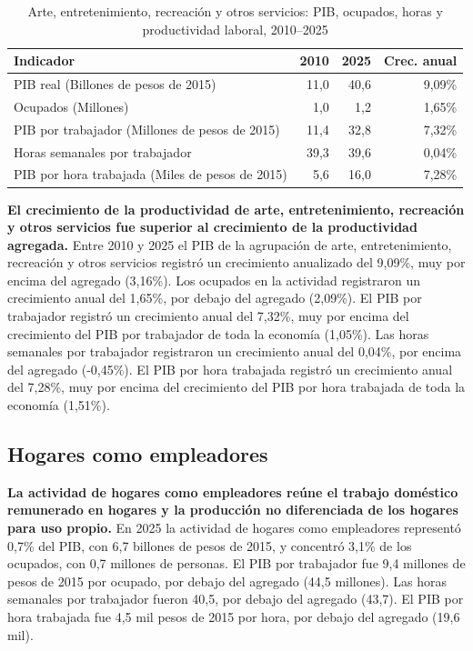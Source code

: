 \begin{table}[H]
\centering
\caption{Arte, entretenimiento, recreación y otros servicios: PIB, ocupados, horas y productividad laboral, 2010--2025}
\label{tab:sector_r_s_productividad}
\small
\begin{tabular}{lrrr}
\toprule
Indicador & 2010 & 2025 & Crec. anual \\
\midrule
PIB real  (Billones de pesos de 2015) & 11,0 & 40,6 & 9,09\% \\
Ocupados (Millones) & 1,0 & 1,2 & 1,65\% \\
PIB por trabajador (Millones de pesos de 2015) & 11,4 & 32,8 & 7,32\% \\
Horas semanales por trabajador & 39,3 & 39,6 & 0,04\% \\
PIB por hora trabajada (Miles de pesos de 2015) & 5,6 & 16,0 & 7,28\% \\
\bottomrule
\end{tabular}
\end{table}

\textbf{El crecimiento de la productividad de arte, entretenimiento, recreación y otros servicios fue superior al crecimiento de la productividad agregada.} Entre 2010 y 2025 el PIB de la agrupación de arte, entretenimiento, recreación y otros servicios registró un crecimiento anualizado del 9,09\%, muy por encima del agregado (3,16\%). Los ocupados en la actividad registraron un crecimiento anual del 1,65\%, por debajo del agregado (2,09\%). El PIB por trabajador registró un crecimiento anual del 7,32\%, muy por encima del crecimiento del PIB por trabajador de toda la economía (1,05\%). Las horas semanales por trabajador registraron un crecimiento anual del 0,04\%, por encima del agregado (-0,45\%). El PIB por hora trabajada registró un crecimiento anual del 7,28\%, muy por encima del crecimiento del PIB por hora trabajada de toda la economía (1,51\%).

\subsection{Hogares como empleadores}

\textbf{La actividad de hogares como empleadores reúne el trabajo doméstico remunerado en hogares y la producción no diferenciada de los hogares para uso propio.} En 2025 la actividad de hogares como empleadores representó 0,7\% del PIB, con 6,7 billones de pesos de 2015, y concentró 3,1\% de los ocupados, con 0,7 millones de personas. El PIB por trabajador fue 9,4 millones de pesos de 2015 por ocupado, por debajo del agregado (44,5 millones). Las horas semanales por trabajador fueron 40,5, por debajo del agregado (43,7). El PIB por hora trabajada fue 4,5 mil pesos de 2015 por hora, por debajo del agregado (19,6 mil).

